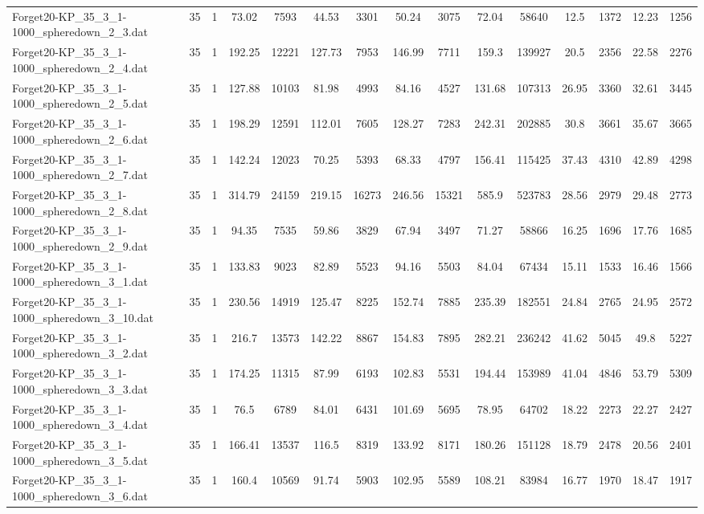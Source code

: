 \begin{table}[!ht]
{\begin{tabular}{lcccccccccccccc}
Forget20-KP\_35\_3\_1-1000\_spheredown\_2\_3.dat & 35 & 1 & 73.02 & 7593 & 44.53 & 3301 & 50.24 & 3075 & 72.04 & 58640 & 12.5 & 1372 & 12.23 & 1256 \\
Forget20-KP\_35\_3\_1-1000\_spheredown\_2\_4.dat & 35 & 1 & 192.25 & 12221 & 127.73 & 7953 & 146.99 & 7711 & 159.3 & 139927 & 20.5 & 2356 & 22.58 & 2276 \\
Forget20-KP\_35\_3\_1-1000\_spheredown\_2\_5.dat & 35 & 1 & 127.88 & 10103 & 81.98 & 4993 & 84.16 & 4527 & 131.68 & 107313 & 26.95 & 3360 & 32.61 & 3445 \\
Forget20-KP\_35\_3\_1-1000\_spheredown\_2\_6.dat & 35 & 1 & 198.29 & 12591 & 112.01 & 7605 & 128.27 & 7283 & 242.31 & 202885 & 30.8 & 3661 & 35.67 & 3665 \\
Forget20-KP\_35\_3\_1-1000\_spheredown\_2\_7.dat & 35 & 1 & 142.24 & 12023 & 70.25 & 5393 & 68.33 & 4797 & 156.41 & 115425 & 37.43 & 4310 & 42.89 & 4298 \\
Forget20-KP\_35\_3\_1-1000\_spheredown\_2\_8.dat & 35 & 1 & 314.79 & 24159 & 219.15 & 16273 & 246.56 & 15321 & 585.9 & 523783 & 28.56 & 2979 & 29.48 & 2773 \\
Forget20-KP\_35\_3\_1-1000\_spheredown\_2\_9.dat & 35 & 1 & 94.35 & 7535 & 59.86 & 3829 & 67.94 & 3497 & 71.27 & 58866 & 16.25 & 1696 & 17.76 & 1685 \\
Forget20-KP\_35\_3\_1-1000\_spheredown\_3\_1.dat & 35 & 1 & 133.83 & 9023 & 82.89 & 5523 & 94.16 & 5503 & 84.04 & 67434 & 15.11 & 1533 & 16.46 & 1566 \\
Forget20-KP\_35\_3\_1-1000\_spheredown\_3\_10.dat & 35 & 1 & 230.56 & 14919 & 125.47 & 8225 & 152.74 & 7885 & 235.39 & 182551 & 24.84 & 2765 & 24.95 & 2572 \\
Forget20-KP\_35\_3\_1-1000\_spheredown\_3\_2.dat & 35 & 1 & 216.7 & 13573 & 142.22 & 8867 & 154.83 & 7895 & 282.21 & 236242 & 41.62 & 5045 & 49.8 & 5227 \\
Forget20-KP\_35\_3\_1-1000\_spheredown\_3\_3.dat & 35 & 1 & 174.25 & 11315 & 87.99 & 6193 & 102.83 & 5531 & 194.44 & 153989 & 41.04 & 4846 & 53.79 & 5309 \\
Forget20-KP\_35\_3\_1-1000\_spheredown\_3\_4.dat & 35 & 1 & 76.5 & 6789 & 84.01 & 6431 & 101.69 & 5695 & 78.95 & 64702 & 18.22 & 2273 & 22.27 & 2427 \\
Forget20-KP\_35\_3\_1-1000\_spheredown\_3\_5.dat & 35 & 1 & 166.41 & 13537 & 116.5 & 8319 & 133.92 & 8171 & 180.26 & 151128 & 18.79 & 2478 & 20.56 & 2401 \\
Forget20-KP\_35\_3\_1-1000\_spheredown\_3\_6.dat & 35 & 1 & 160.4 & 10569 & 91.74 & 5903 & 102.95 & 5589 & 108.21 & 83984 & 16.77 & 1970 & 18.47 & 1917 \\

\end{tabular}}
\end{table}
